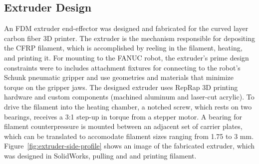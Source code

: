 
\subsection*{Extruder Design}

An FDM extruder end-effector was designed and fabricated for the curved layer carbon fiber 3D printer. The extruder is the mechanism responsible for depositing the CFRP filament, which is accomplished by reeling in the filament, heating, and printing it. For mounting to the FANUC robot, the extruder's prime design constraints were to includes attachment fixtures for connecting to the robot's Schunk pneumatic gripper and use geometries and materials that minimize torque on the gripper jaws. The designed extruder uses RepRap 3D printing hardware and custom components (machined aluminum and laser-cut acrylic). To drive the filament into the heating chamber, a notched screw, which rests on two bearings, receives a 3:1 step-up in torque from a stepper motor. A bearing for filament counterpressure is mounted between an adjacent set of carrier plates, which can be translated to accomodate filament sizes ranging from 1.75 to 3 mm. Figure~\ref{fig:extruder-side-profile} shows an image of the fabricated extruder, which was designed in SolidWorks, pulling and and printing filament.


